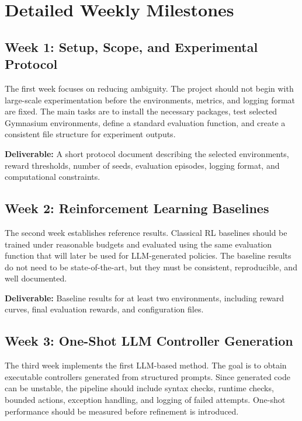 \documentclass[12pt]{article}
\newcommand{\deliverable}[1]{\textbf{Deliverable:} #1}
\begin{document}
\section{Detailed Weekly Milestones}

\subsection*{Week 1: Setup, Scope, and Experimental Protocol}

The first week focuses on reducing ambiguity. The project should not begin with large-scale experimentation before the environments, metrics, and logging format are fixed. The main tasks are to install the necessary packages, test selected Gymnasium environments, define a standard evaluation function, and create a consistent file structure for experiment outputs.

\deliverable{A short protocol document describing the selected environments, reward thresholds, number of seeds, evaluation episodes, logging format, and computational constraints.}

\subsection*{Week 2: Reinforcement Learning Baselines}

The second week establishes reference results. Classical RL baselines should be trained under reasonable budgets and evaluated using the same evaluation function that will later be used for LLM-generated policies. The baseline results do not need to be state-of-the-art, but they must be consistent, reproducible, and well documented.

\deliverable{Baseline results for at least two environments, including reward curves, final evaluation rewards, and configuration files.}

\subsection*{Week 3: One-Shot LLM Controller Generation}

The third week implements the first LLM-based method. The goal is to obtain executable controllers generated from structured prompts. Since generated code can be unstable, the pipeline should include syntax checks, runtime checks, bounded actions, exception handling, and logging of failed attempts. One-shot performance should be measured before refinement is introduced.
\end{document}
